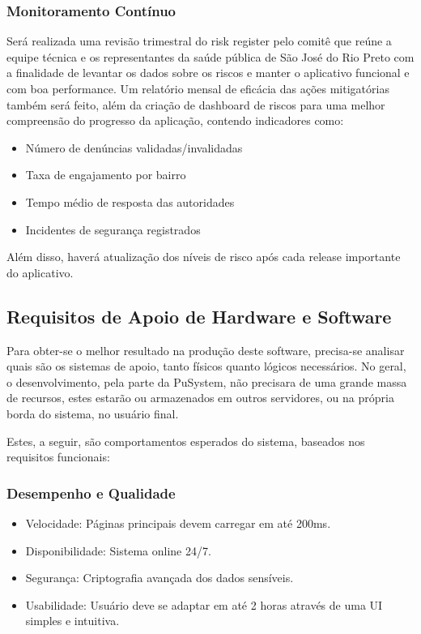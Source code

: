 \documentclass[a5paper, 12pt]{article}
\begin{document}
\subsubsection{Monitoramento Contínuo}
    Será realizada uma revisão trimestral do risk register pelo comitê que reúne a equipe técnica e os representantes da saúde pública de São José do Rio Preto com a finalidade de levantar os dados sobre os riscos e manter o aplicativo funcional e com boa performance. 
    Um relatório mensal de eficácia das ações mitigatórias também será feito, além da criação de dashboard de riscos para uma melhor compreensão do progresso da aplicação, contendo indicadores como: 
    \begin{itemize}
        \item Número de denúncias validadas/invalidadas
        \item Taxa de engajamento por bairro
        \item Tempo médio de resposta das autoridades
        \item Incidentes de segurança registrados
    \end{itemize}
    Além disso, haverá atualização dos níveis de risco após cada release importante do aplicativo.



\subsection{Requisitos de Apoio de Hardware e Software}

Para obter-se o melhor resultado na produção deste software, precisa-se analisar quais são os sistemas de apoio, tanto físicos quanto lógicos necessários. No geral, o desenvolvimento, pela parte da PuSystem, não precisara de uma grande massa de recursos, estes estarão ou armazenados em outros servidores, ou na própria borda do sistema, no usuário final. 

Estes, a seguir, são comportamentos esperados do sistema, baseados nos requisitos funcionais: 

\subsubsection{Desempenho e Qualidade}
\begin{itemize}[]
  \item Velocidade: Páginas principais devem carregar em até 200ms.
  \item Disponibilidade: Sistema online 24/7.
  \item Segurança: Criptografia avançada dos dados sensíveis.
  \item Usabilidade: Usuário deve se adaptar em até 2 horas através de uma UI simples e intuitiva.
\end{itemize}
\end{document}
